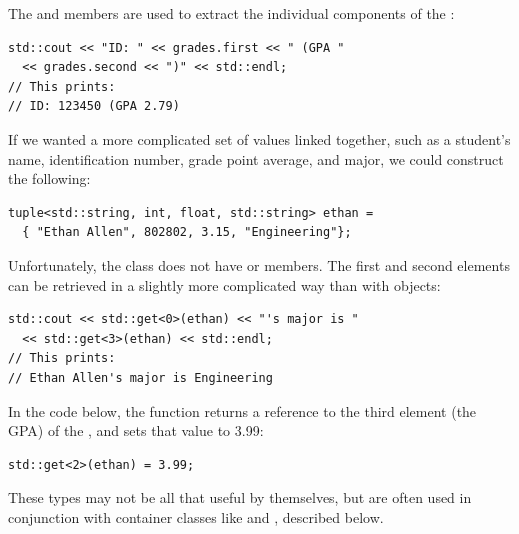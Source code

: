 The  and  members are used to extract the individual components of the :

\noindent\begin{minipage}{\linewidth}\begin{lstlisting}
std::cout << "ID: " << grades.first << " (GPA " 
  << grades.second << ")" << std::endl;
// This prints:
// ID: 123450 (GPA 2.79)
\end{lstlisting}\end{minipage}

If we wanted a more complicated set of values linked together, such as a student's name, identification number, grade point average, and major, we could construct the following:

\noindent\begin{minipage}{\linewidth}\begin{lstlisting}
tuple<std::string, int, float, std::string> ethan = 
  { "Ethan Allen", 802802, 3.15, "Engineering"};
\end{lstlisting}\end{minipage}

Unfortunately, the  class does not have  or  members. 
The first and second elements can be retrieved in a slightly more complicated way than with  objects:

\noindent\begin{minipage}{\linewidth}\begin{lstlisting}
std::cout << std::get<0>(ethan) << "'s major is " 
  << std::get<3>(ethan) << std::endl;
// This prints:
// Ethan Allen's major is Engineering
\end{lstlisting}\end{minipage}

In the code below, the  function returns a reference to the third element (the GPA) of the , and sets that value to 3.99:

\noindent\begin{minipage}{\linewidth}\begin{lstlisting}
std::get<2>(ethan) = 3.99;
\end{lstlisting}\end{minipage}

These types may not be all that useful by themselves, but are often used in conjunction with container classes like  and , described below.


